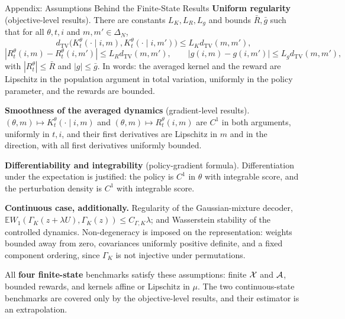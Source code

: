 \documentclass[9pt]{beamer}
\def\Xc{{\cal X}}
\def\Ac{{\cal A}}
\def\E{{\mathbb E}}
\newcommand{\TV}{d_{\mathrm{TV}}}
\begin{document}
\begin{frame}{Appendix: Assumptions Behind the Finite-State Results}
\footnotesize
\textbf{Uniform regularity} (objective-level results). There are constants $L_K,L_R,L_g$ and bounds $\bar R,\bar g$ such that for all $\theta,t,i$ and $m,m'\in\Delta_N$,
\[
  \TV\big(K_t^\theta(\cdot\mid i,m),K_t^\theta(\cdot\mid i,m')\big)\leq L_K\TV(m,m'),
\]
\[
  |R_t^\theta(i,m)-R_t^\theta(i,m')|\leq L_R\TV(m,m'),
  \qquad
  |g(i,m)-g(i,m')|\leq L_g\TV(m,m'),
\]
with $|R_t^\theta|\leq\bar R$ and $|g|\leq\bar g$. In words: the averaged kernel and the reward are Lipschitz in the population argument in total variation, uniformly in the policy parameter, and the rewards are bounded.

\vspace{0.2cm}
\textbf{Smoothness of the averaged dynamics} (gradient-level results). $(\theta,m)\mapsto K_t^\theta(\cdot\mid i,m)$ and $(\theta,m)\mapsto R_t^\theta(i,m)$ are $C^1$ in both arguments, uniformly in $t,i$, and their first derivatives are Lipschitz in $m$ and in the direction, with all first derivatives uniformly bounded.

\vspace{0.2cm}
\textbf{Differentiability and integrability} (policy-gradient formula). Differentiation under the expectation is justified: the policy is $C^1$ in $\theta$ with integrable score, and the perturbation density is $C^1$ with integrable score.

\vspace{0.2cm}
\textbf{Continuous case, additionally.} Regularity of the Gaussian-mixture decoder, $\E W_1(\Gamma_K(z+\lambda U),\Gamma_K(z))\leq C_{\Gamma,K}\lambda$; and Wasserstein stability of the controlled dynamics. Non-degeneracy is imposed on the representation: weights bounded away from zero, covariances uniformly positive definite, and a fixed component ordering, since $\Gamma_K$ is not injective under permutations.

\vspace{0.15cm}
\scriptsize
All \textbf{four finite-state} benchmarks satisfy these assumptions: finite $\Xc$ and $\Ac$, bounded rewards, and kernels affine or Lipschitz in $\mu$. The two continuous-state benchmarks are covered only by the objective-level results, and their estimator is an extrapolation.
\end{frame}
\end{document}
